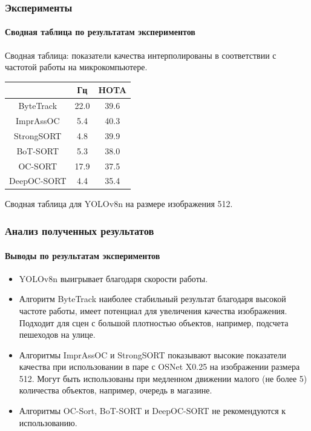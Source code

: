 \documentclass{beamer} %
\begin{document}
\begin{frame}
  \frametitle{Эксперименты}
  \framesubtitle{Сводная таблица по результатам экспериментов}
  Сводная таблица: показатели качества интерполированы в соответствии с частотой работы на микрокомпьютере. 

  \centering
  \large{
  \begin{center}
    \begin{tabular}{ c|c|c } 
     \hline
      & Гц & HOTA \\ 
      \hline
    ByteTrack & 22.0 & 39.6\\
    ImprAssOC & 5.4 & 40.3\\
    StrongSORT & 4.8 & 39.9\\
    BoT-SORT & 5.3 & 38.0\\
    OC-SORT & 17.9 & 37.5\\
    DeepOC-SORT & 4.4 & 35.4\\
     \hline
    \end{tabular}
  \end{center}
  }
  \small Сводная таблица для YOLOv8n на размере изображения 512.
\end{frame}


\begin{frame}
  \frametitle{Анализ полученных результатов}
  \framesubtitle{Выводы по результатам экспериментов}
  \begin{itemize}
    \item YOLOv8n выигрывает благодаря скорости работы.
    \item Алгоритм ByteTrack наиболее стабильный результат благодаря высокой частоте работы, имеет потенциал для увеличения качества изображения. Подходит для сцен с большой плотностью объектов, например, подсчета пешеходов на улице.
    \item Алгоритмы ImprAssOC и StrongSORT показывают высокие показатели качества при использовании в паре с OSNet X0.25 на изображении размера 512. Могут быть использованы при медленном движении малого (не более 5) количества объектов, например, очередь в магазине.
    \item Алгоритмы OC-Sort, BoT-SORT и DeepOC-SORT не рекомендуются к использованию.
  \end{itemize}
\end{frame}
\end{document}
